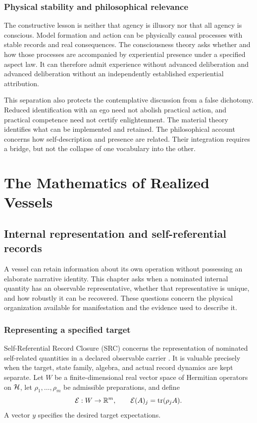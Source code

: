 \section{Physical stability and philosophical relevance}\label{section:resources:physical-stability-and-philosophical-relevance}
The constructive lesson is neither that agency is illusory nor that all agency is conscious. Model formation and action can be physically causal processes with stable records and real consequences. The consciousness theory asks whether and how those processes are accompanied by experiential presence under a specified aspect law. It can therefore admit experience without advanced deliberation and advanced deliberation without an independently established experiential attribution.

This separation also protects the contemplative discussion from a false dichotomy. Reduced identification with an ego need not abolish practical action, and practical competence need not certify enlightenment. The material theory identifies what can be implemented and retained. The philosophical account concerns how self-description and presence are related. Their integration requires a bridge, but not the collapse of one vocabulary into the other.


\part{The Mathematics of Realized Vessels}\label{part:vessels}
\chapter{Internal representation and self-referential records}\label{ch:src}
A vessel can retain information about its own operation without possessing an elaborate narrative identity. This chapter asks when a nominated internal quantity has an observable representative, whether that representative is unique, and how robustly it can be recovered. These questions concern the physical organization available for manifestation and the evidence used to describe it.

\section{Representing a specified target}\label{section:src:representing-a-specified-target}
Self-Referential Record Closure (SRC) concerns the representation of nominated self-related quantities in a declared observable carrier \cite{RodgersSRC}. It is valuable precisely when the target, state family, algebra, and actual record dynamics are kept separate. Let $W$ be a finite-dimensional real vector space of Hermitian operators on $\mathcal H$, let $\rho_1,\ldots,\rho_m$ be admissible preparations, and define
\[
\mathcal E:W\to\mathbb R^m,\qquad
\mathcal E(A)_j=\operatorname{tr}(\rho_jA).
\]
A vector $y$ specifies the desired target expectations.

